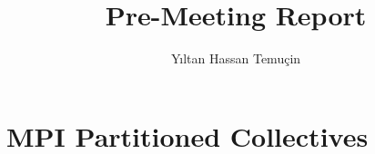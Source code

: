 \documentclass{article}
\begin{document}
\frontmatter
  \title{Pre-Meeting Report}
  \author{Y{\i}ltan Hassan Temu\c{c}in}
  \maketitle
  \tableofcontents
  \mainmatter

%

  \vspace{-1\baselineskip}
  \section{MPI Partitioned Collectives}
  \vspace{-0.5\baselineskip}
\end{document}
